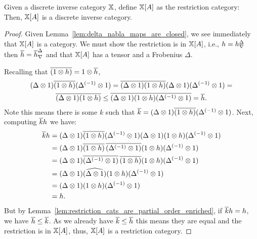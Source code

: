 \begin{proposition}\label{prop:slice-a-is-a-discrete-inverse-category}
  Given a discrete inverse category $\mathbb{X}$, define $\mathbb{X}[A]$ as  the restriction category:
  Then, $\mathbb{X}[A]$ is a discrete inverse category.
\end{proposition}
\begin{proof}
  Given Lemma~\ref{lem:delta_nabla_maps_are_closed}, we see immediately that $\mathbb{X}[A]$ is a
  category. We must show the restriction is in $\mathbb{X}[A]$, i.e.,
  $h={h}^{\Delta}_{\nabla}$ then $\overline{h} = {\overline{h}}^{\Delta}_{\nabla}$ and that $\mathbb{X}[A]$ has a tensor and a Frobenius $\Delta$.

  Recalling that $\overline{(1\otimes h)} = 1\otimes \overline{h}$,
  \begin{multline*}
    (\Delta\otimes1) \overline{(1\otimes h)} ({\Delta}^{(-1)}\otimes1) = \overline{(\Delta\otimes1)(1\otimes h)}(\Delta\otimes1)({\Delta}^{(-1)}\otimes1)
    = \\
    \overline{(\Delta\otimes1)(1\otimes h)} \le \overline{(\Delta\otimes1)(1\otimes h)({\Delta}^{(-1)}\otimes1)} = \overline{h}.
  \end{multline*}
  Note this means there is some $k$ such that
  $\overline{k} = (\Delta\otimes1) \overline{(1\otimes h)}({\Delta}^{(-1)}\otimes1)$. Next, computing $\overline{k}h$ we have:
  \begin{align*}
    \overline{k}h &= (\Delta\otimes1) \overline{(1\otimes h)} ({\Delta}^{(-1)}\otimes1) (\Delta\otimes1) (1\otimes h) ({\Delta}^{(-1)}\otimes1) \\
    & = (\Delta\otimes1) \overline{(1\otimes h)}\, \overline{({\Delta}^{(-1)}\otimes1)} (1\otimes h) ({\Delta}^{(-1)}\otimes1) \\
    & = (\Delta\otimes1) \overline{({\Delta}^{(-1)}\otimes1)}\,  \overline{(1\otimes h)}(1\otimes h) ({\Delta}^{(-1)}\otimes1) \\
    & = (\Delta\otimes1) \widehat{(\Delta\otimes1)}  (1\otimes h) ({\Delta}^{(-1)}\otimes1) \\
    & = (\Delta\otimes1) (1\otimes h) ({\Delta}^{(-1)}\otimes1) \\
    & = h.
  \end{align*}
  But by Lemma~\ref{lem:restriction_cats_are_partial_order_enriched}, if $\overline{k} h = h$, we have
  $\overline{h} \le \overline{k}$. As we already have $\overline{k}\le\overline{h}$ this means they are equal and the
  restriction is in $\mathbb{X}[A]$, thus, $\mathbb{X}[A]$ is a restriction category.


\end{proof}
